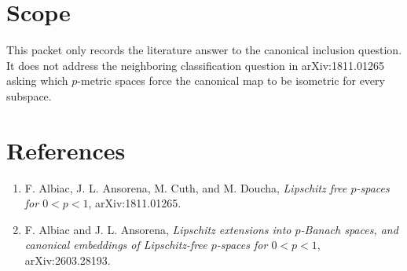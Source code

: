 \documentclass[11pt]{article}
\begin{document}
\section*{Scope}

This packet only records the literature answer to the canonical inclusion
question. It does not address the neighboring classification question in
arXiv:1811.01265 asking which $p$-metric spaces force the canonical map to be
isometric for every subspace.

\section*{References}

\begin{enumerate}
\item F. Albiac, J. L. Ansorena, M. Cuth, and M. Doucha,
\emph{Lipschitz free $p$-spaces for $0<p<1$}, arXiv:1811.01265.
\item F. Albiac and J. L. Ansorena,
\emph{Lipschitz extensions into $p$-Banach spaces, and canonical embeddings of
Lipschitz-free $p$-spaces for $0<p<1$}, arXiv:2603.28193.
\end{enumerate}
\end{document}
